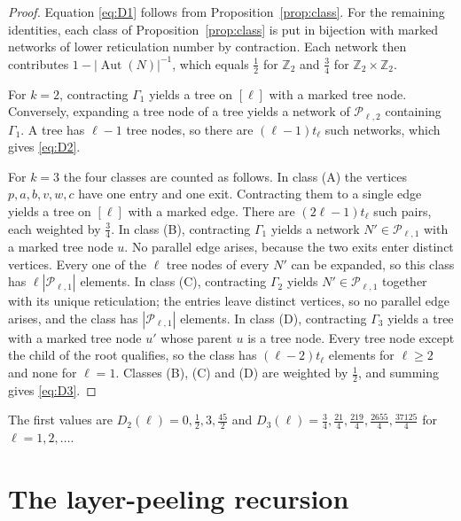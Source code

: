 \documentclass[11pt,a4paper]{article}
\theoremstyle{definition}
\newcommand{\Aut}{\operatorname{Aut}}
\newcommand{\cP}{\mathcal{P}}
\begin{document}
\begin{proof}
Equation \eqref{eq:D1} follows from Proposition~\ref{prop:class}. For the remaining identities, each class of Proposition~\ref{prop:class} is put in bijection with marked networks of lower reticulation number by contraction. Each network then contributes $1-|\Aut(N)|^{-1}$, which equals $\tfrac12$ for $\mathbb{Z}_2$ and $\tfrac34$ for $\mathbb{Z}_2\times\mathbb{Z}_2$.

For $k=2$, contracting $\Gamma_1$ yields a tree on $[\ell]$ with a marked tree node. Conversely, expanding a tree node of a tree yields a network of $\cP_{\ell,2}$ containing $\Gamma_1$. A tree has $\ell-1$ tree nodes, so there are $(\ell-1)t_\ell$ such networks, which gives \eqref{eq:D2}.

For $k=3$ the four classes are counted as follows. In class (A) the vertices $p,a,b,v,w,c$ have one entry and one exit. Contracting them to a single edge yields a tree on $[\ell]$ with a marked edge. There are $(2\ell-1)t_\ell$ such pairs, each weighted by $\tfrac34$. In class (B), contracting $\Gamma_1$ yields a network $N'\in\cP_{\ell,1}$ with a marked tree node $u$. No parallel edge arises, because the two exits enter distinct vertices. Every one of the $\ell$ tree nodes of every $N'$ can be expanded, so this class has $\ell|\cP_{\ell,1}|$ elements. In class (C), contracting $\Gamma_2$ yields $N'\in\cP_{\ell,1}$ together with its unique reticulation; the entries leave distinct vertices, so no parallel edge arises, and the class has $|\cP_{\ell,1}|$ elements. In class (D), contracting $\Gamma_3$ yields a tree with a marked tree node $u'$ whose parent $u$ is a tree node. Every tree node except the child of the root qualifies, so the class has $(\ell-2)t_\ell$ elements for $\ell\ge2$ and none for $\ell=1$. Classes (B), (C) and (D) are weighted by $\tfrac12$, and summing gives \eqref{eq:D3}.
\end{proof}

The first values are $D_2(\ell)=0,\tfrac12,3,\tfrac{45}{2}$ and $D_3(\ell)=\tfrac34,\tfrac{21}{4},\tfrac{219}{4},\tfrac{2655}{4},\tfrac{37125}{4}$ for $\ell=1,2,\dots$.


\section{The layer-peeling recursion}\label{sec:recursion}
\end{document}
